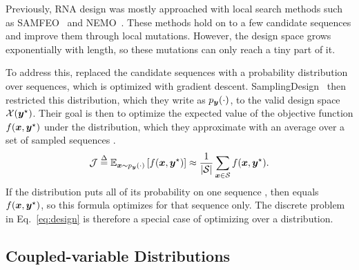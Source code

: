 Previously, RNA design was mostly approached with local search methods such as SAMFEO~\citep{zhou2023} and NEMO~\citep{portela2018}. These methods hold on to a few candidate sequences and improve them through local mutations. However, the design space grows exponentially with length, so these mutations can only reach a tiny part of it.

To address this, \citet{matthies2023} replaced the candidate sequences with a probability distribution over sequences, which is optimized with gradient descent. SamplingDesign~\citep{tang2026} then restricted this distribution, which they write as $p_{\boldsymbol{{y}}}(\cdot)$, to the valid design space $\mathcal{X}(\boldsymbol{{y}}^\star)$. Their goal is then to optimize the expected value \obj of the objective function $f(\boldsymbol{{x}},\boldsymbol{{y}}^\star)$ under the distribution, which they approximate with an average over a set of sampled sequences \SAMPLES.
\begin{equation}
\mathcal{J}\stackrel{\Delta}{=}\mathbb{E}_{\boldsymbol{{x}}\sim p_{\boldsymbol{{y}}}(\cdot)}\left[f(\boldsymbol{{x}},\boldsymbol{{y}}^\star)\right]\approx\frac{1}{|\mathcal{S}|}\sum_{\boldsymbol{{x}}\in\mathcal{S}}f(\boldsymbol{{x}},\boldsymbol{{y}}^\star).
\label{eq:minimize}
\end{equation}
If the distribution puts all of its probability on one sequence \vecx, then \obj equals $f(\boldsymbol{{x}},\boldsymbol{{y}}^\star)$, so this formula optimizes for that sequence only. The discrete problem in Eq.~\ref{eq:design} is therefore a special case of optimizing over a distribution.



\subsection{Coupled-variable Distributions}\label{sec:relaxation}

